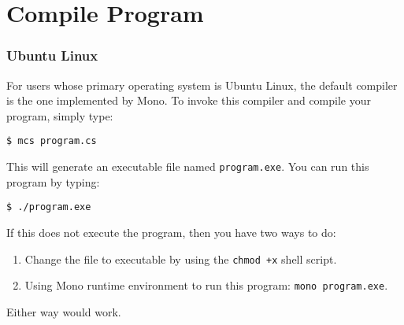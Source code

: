 \documentclass[../main.tex]{subfiles}
\begin{document}
\chapter{Compile \csharp Program}

\subsection{Ubuntu Linux}
For users whose primary operating system is Ubuntu Linux, the default \csharp
compiler is the one implemented by Mono. To invoke this compiler and compile
your program, simply type:

\texttt{\$ mcs program.cs}

This will generate an executable file named \texttt{program.exe}. You can run
this program by typing:

\texttt{\$ ./program.exe}

If this does not execute the program, then you have two ways to do:
\begin{enumerate}
    \item Change the file to executable by using the \texttt{chmod +x} shell script.
    \item Using Mono runtime environment to run this program: \texttt{mono program.exe}.
\end{enumerate}
Either way would work.
\end{document}
